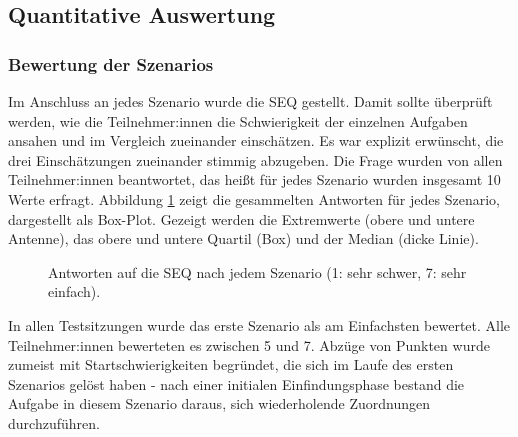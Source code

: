 \subsection{Quantitative Auswertung}
\label{sec:quantitative}


\subsubsection{Bewertung der Szenarios}

Im Anschluss an jedes Szenario wurde die \ac{SEQ} gestellt. Damit sollte überprüft werden, wie die Teilnehmer:innen die Schwierigkeit der einzelnen Aufgaben ansahen und im Vergleich zueinander einschätzen. Es war explizit erwünscht, die drei Einschätzungen zueinander stimmig abzugeben. Die Frage wurden von allen Teilnehmer:innen beantwortet, das heißt für jedes Szenario wurden insgesamt 10 Werte erfragt. Abbildung \ref{fig:seq} zeigt die gesammelten Antworten für jedes Szenario, dargestellt als Box-Plot. Gezeigt werden die Extremwerte (obere und untere Antenne), das obere und untere Quartil (Box) und der Median (dicke Linie).

\begin{figure}[!ht]
  \datatable
  \centering
  \caption{Antworten auf die \acs{SEQ} nach jedem Szenario (1: sehr schwer, 7: sehr einfach).}
  \label{fig:seq}
\end{figure}

In allen Testsitzungen wurde das erste Szenario als am Einfachsten bewertet. Alle Teilnehmer:innen bewerteten es zwischen 5 und 7. Abzüge von Punkten wurde zumeist mit Startschwierigkeiten begründet, die sich im Laufe des ersten Szenarios gelöst haben - nach einer initialen Einfindungsphase bestand die Aufgabe in diesem Szenario daraus, sich wiederholende Zuordnungen durchzuführen.

